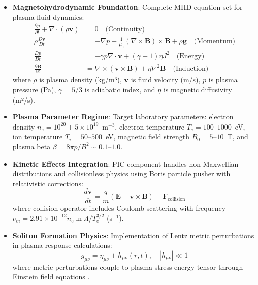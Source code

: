 \documentclass[12pt,a4paper]{article}
\begin{document}
\begin{itemize}
\item \textbf{Magnetohydrodynamic Foundation}: Complete MHD equation set for plasma fluid dynamics:
\begin{align}
\frac{\partial \rho}{\partial t} + \nabla \cdot (\rho \mathbf{v}) &= 0 \quad \text{(Continuity)} \\
\rho \frac{D\mathbf{v}}{Dt} &= -\nabla p + \frac{1}{\mu_0}(\nabla \times \mathbf{B}) \times \mathbf{B} + \rho \mathbf{g} \quad \text{(Momentum)} \\
\frac{Dp}{Dt} &= -\gamma p \nabla \cdot \mathbf{v} + (\gamma - 1) \eta J^2 \quad \text{(Energy)} \\
\frac{\partial \mathbf{B}}{\partial t} &= \nabla \times (\mathbf{v} \times \mathbf{B}) + \eta \nabla^2 \mathbf{B} \quad \text{(Induction)}
\end{align}
where $\rho$ is plasma density (kg/m³), $\mathbf{v}$ is fluid velocity (m/s), $p$ is plasma pressure (Pa), $\gamma = 5/3$ is adiabatic index, and $\eta$ is magnetic diffusivity (m²/s).

\item \textbf{Plasma Parameter Regime}: Target laboratory parameters: electron density $n_e = 10^{20} \pm 5 \times 10^{19}$~m$^{-3}$, electron temperature $T_e = 100$--$1000$~eV, ion temperature $T_i = 50$--$500$~eV, magnetic field strength $B_0 = 5$--$10$~T, and plasma beta $\beta = 8\pi p / B^2 \sim 0.1$--$1.0$.

\item \textbf{Kinetic Effects Integration}: PIC component handles non-Maxwellian distributions and collisionless physics using Boris particle pusher with relativistic corrections:
\begin{equation}
\frac{d\mathbf{v}}{dt} = \frac{q}{m}\left(\mathbf{E} + \mathbf{v} \times \mathbf{B}\right) + \mathbf{F}_{\text{collision}}
\end{equation}
where collision operator includes Coulomb scattering with frequency $\nu_{ei} = 2.91 \times 10^{-12} n_e \ln\Lambda / T_e^{3/2}$ (s$^{-1}$).

\item \textbf{Soliton Formation Physics}: Implementation of Lentz metric perturbations in plasma response calculations:
\begin{equation}
g_{\mu\nu} = \eta_{\mu\nu} + h_{\mu\nu}(r,t), \quad |h_{\mu\nu}| \ll 1
\end{equation}
where metric perturbations couple to plasma stress-energy tensor through Einstein field equations \cite{parker2009quantum}.


\end{itemize}
\end{document}
